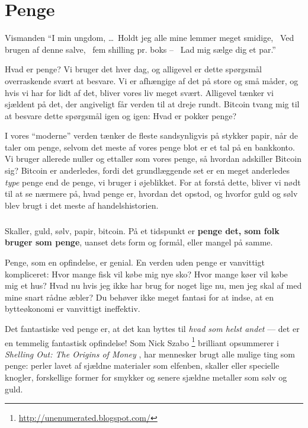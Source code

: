 \chapter{Penge}
\label{les:11}

\begin{chapquote}{Vismanden}
\enquote{I min ungdom, \ldots \
Holdt jeg alle mine lemmer meget smidige, \
Ved brugen af denne salve, \
fem shilling pr. boks -- \
Lad mig sælge dig et par.}
\end{chapquote}

Hvad er penge? Vi bruger det hver dag, og alligevel er dette spørgsmål 
overraskende svært at besvare. Vi er afhængige af det på store og små måder, 
og hvis vi har for lidt af det, bliver vores liv meget svært. Alligevel tænker 
vi sjældent på det, der angiveligt får verden til at dreje rundt. Bitcoin tvang
mig til at besvare dette spørgsmål igen og igen: Hvad er pokker penge?

I vores \enquote{moderne} verden tænker de fleste sandsynligvis på stykker 
papir, når de taler om penge, selvom det meste af vores penge blot er et tal 
på en bankkonto. Vi bruger allerede nuller og ettaller som vores penge, så 
hvordan adskiller Bitcoin sig? Bitcoin er anderledes, fordi det grundlæggende 
set er en meget anderledes \textit{type} penge end de penge, vi bruger i
øjeblikket. For at forstå dette, bliver vi nødt til at se nærmere på, hvad 
penge er, hvordan det opstod, og hvorfor guld og sølv blev brugt i det meste 
af handelshistorien.

\paragraph{}
Skaller, guld, sølv, papir, bitcoin. På et tidspunkt er \textbf{penge det, 
som folk bruger som penge}, uanset dets form og formål, eller mangel på samme.

Penge, som en opfindelse, er genial. En verden uden penge er vanvittigt 
kompliceret: Hvor mange fisk vil købe mig nye sko? Hvor mange køer vil købe 
mig et hus? Hvad nu hvis jeg ikke har brug for noget lige nu, men jeg skal af
med mine snart rådne æbler? Du behøver ikke meget fantasi for at indse, at en 
bytteøkonomi er vanvittigt ineffektiv.

Det fantastiske ved penge er, at det kan byttes til \textit{hvad som helst 
andet} --- det er en temmelig fantastisk opfindelse! Som Nick Szabo
\footnote{\url{http://unenumerated.blogspot.com/}} brilliant opsummerer i 
\textit{Shelling Out: The Origins of Money} \cite{shelling-out}, har mennesker 
brugt alle mulige ting som penge: perler lavet af sjældne materialer som 
elfenben, skaller eller specielle knogler, forskellige former for smykker og 
senere sjældne metaller som sølv og guld.


